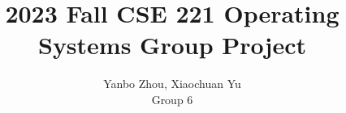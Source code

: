 \documentclass[letterpaper,twocolumn,10pt]{usetex-v1}
\begin{document}

\date{}

\title{2023 Fall CSE 221 Operating Systems Group Project}

\author{{Yanbo Zhou, Xiaochuan Yu} \\ Group 6}

\maketitle






\clearpage



%
\end{document}
